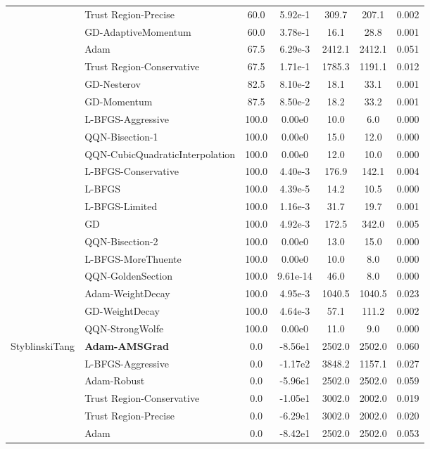 \documentclass{article}
\begin{document}
\begin{table}[htbp]
{\begin{tabular}{p{2.5cm}p{2.5cm}*{5}{c}}
 & Trust Region-Precise & 60.0 & 5.92e-1 & 309.7 & 207.1 & 0.002 \\
 & GD-AdaptiveMomentum & 60.0 & 3.78e-1 & 16.1 & 28.8 & 0.001 \\
 & Adam & 67.5 & 6.29e-3 & 2412.1 & 2412.1 & 0.051 \\
 & Trust Region-Conservative & 67.5 & 1.71e-1 & 1785.3 & 1191.1 & 0.012 \\
 & GD-Nesterov & 82.5 & 8.10e-2 & 18.1 & 33.1 & 0.001 \\
 & GD-Momentum & 87.5 & 8.50e-2 & 18.2 & 33.2 & 0.001 \\
 & L-BFGS-Aggressive & 100.0 & 0.00e0 & 10.0 & 6.0 & 0.000 \\
 & QQN-Bisection-1 & 100.0 & 0.00e0 & 15.0 & 12.0 & 0.000 \\
 & QQN-CubicQuadraticInterpolation & 100.0 & 0.00e0 & 12.0 & 10.0 & 0.000 \\
 & L-BFGS-Conservative & 100.0 & 4.40e-3 & 176.9 & 142.1 & 0.004 \\
 & L-BFGS & 100.0 & 4.39e-5 & 14.2 & 10.5 & 0.000 \\
 & L-BFGS-Limited & 100.0 & 1.16e-3 & 31.7 & 19.7 & 0.001 \\
 & GD & 100.0 & 4.92e-3 & 172.5 & 342.0 & 0.005 \\
 & QQN-Bisection-2 & 100.0 & 0.00e0 & 13.0 & 15.0 & 0.000 \\
 & L-BFGS-MoreThuente & 100.0 & 0.00e0 & 10.0 & 8.0 & 0.000 \\
 & QQN-GoldenSection & 100.0 & 9.61e-14 & 46.0 & 8.0 & 0.000 \\
 & Adam-WeightDecay & 100.0 & 4.95e-3 & 1040.5 & 1040.5 & 0.023 \\
 & GD-WeightDecay & 100.0 & 4.64e-3 & 57.1 & 111.2 & 0.002 \\
 & QQN-StrongWolfe & 100.0 & 0.00e0 & 11.0 & 9.0 & 0.000 \\
\midrule
\multirow{25}{*}{StyblinskiTang} & \textbf{Adam-AMSGrad} & 0.0 & -8.56e1 & 2502.0 & 2502.0 & 0.060 \\
 & L-BFGS-Aggressive & 0.0 & -1.17e2 & 3848.2 & 1157.1 & 0.027 \\
 & Adam-Robust & 0.0 & -5.96e1 & 2502.0 & 2502.0 & 0.059 \\
 & Trust Region-Conservative & 0.0 & -1.05e1 & 3002.0 & 2002.0 & 0.019 \\
 & Trust Region-Precise & 0.0 & -6.29e1 & 3002.0 & 2002.0 & 0.020 \\
 & Adam & 0.0 & -8.42e1 & 2502.0 & 2502.0 & 0.053 \\

\end{tabular}}
\end{table}
\end{document}
